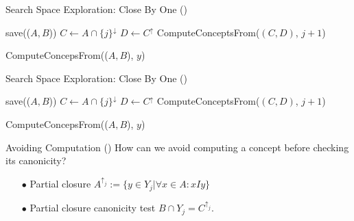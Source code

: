 \documentclass[pdf,xcolor=table]{beamer}
\begin{document}
\begin{frame}[t]{Search Space Exploration: Close By One (\cite{Andrews2015})}
    \begin{algorithm}[H]
        \begin{algorithmic}[1]
            \STATE save(($A, B$))
                    \STATE $C \leftarrow A \cap \{j\}^\downarrow$
                    \STATE $D \leftarrow C^\uparrow$
                        \STATE ComputeConceptsFrom($(C, D)$, $j+1$)
                    \ENDIF
                \ENDIF
            \ENDFOR
        \end{algorithmic}
        \caption{ComputeConcepsFrom(($A, B$), $y$)}
        \label{alg:cbo}
    \end{algorithm}
\end{frame}

\begin{frame}[t]{Search Space Exploration: Close By One (\cite{Andrews2015})}
    \begin{algorithm}[H]
        \begin{algorithmic}[1]
            \STATE save(($A, B$))
                    \STATE $C \leftarrow A \cap \{j\}^\downarrow$
                    \STATE $D \leftarrow C^\uparrow$
                        \STATE ComputeConceptsFrom($(C, D)$, $j+1$)
                    \ENDIF
                \ENDIF
            \ENDFOR
        \end{algorithmic}
        \caption{ComputeConcepsFrom(($A, B$), $y$)}
        \label{alg:cbo_imp}
    \end{algorithm}
\end{frame}

\begin{frame}[t]{Avoiding Computation (\cite{Andrews2015})}
    How can we avoid computing a concept before checking its canonicity?
    \begin{itemize}
        \item[$\bullet$] Partial closure $A^{\uparrow_j} := \{y \in Y_j | \forall x \in A : xIy\}$
        \item[$\bullet$] Partial closure canonicity test $B \cap Y_j = C^{\uparrow_j}$.
    \end{itemize}
\end{frame}
\end{document}
